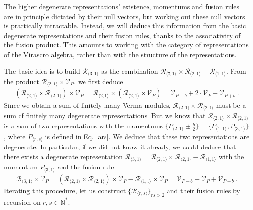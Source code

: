 \documentclass[12pt, a4paper, notitlepage, twoside]{report}
\numberwithin{equation}{section}
\theoremstyle{break}
\begin{document}
The higher degenerate representations' existence, momentums and fusion rules are in principle dictated by their null vectors, but working out these null vectors is practically intractable. 
Instead, we will deduce this information from the basic degenerate representations and their fusion rules, thanks to the associativity of the fusion product. 
This amounts to working with the category of representations of the Virasoro algebra, rather than with the structure of the representations. 

The basic idea is to build $\mathcal{R}_{\langle 3, 1\rangle}$ as the combination $\mathcal{R}_{\langle 2,1 \rangle} \times \mathcal{R}_{\langle 2,1 \rangle} - \mathcal{R}_{\langle 1,1 \rangle}$.
From the product $\mathcal{R}_{\langle 2,1 \rangle}\times \mathcal{V}_P$, we first deduce 
\begin{align}
 \left(\mathcal{R}_{\langle 2,1 \rangle}\times \mathcal{R}_{\langle 2,1 \rangle}\right)\times\mathcal{V}_P = \mathcal{R}_{\langle 2,1 \rangle}\times \left(\mathcal{R}_{\langle 2,1 \rangle}\times\mathcal{V}_P\right) = 
 \mathcal{V}_{P-b} + 2\cdot \mathcal{V}_P + \mathcal{V}_{P+b}\ .
\end{align}
Since we obtain a sum of finitely many Verma modules, $\mathcal{R}_{\langle 2,1 \rangle}\times \mathcal{R}_{\langle 2,1 \rangle}$ must be a sum of finitely many degenerate representations. But we know that $\mathcal{R}_{\langle 2,1 \rangle}\times \mathcal{R}_{\langle 2,1 \rangle}$ is a sum of two representations with the momentums $\{P_{\langle 2,1 \rangle} \pm \frac{b}{2}\} = \{P_{\langle 1,1\rangle}, P_{\langle 3,1\rangle}\}$, where $P_{\langle r,s\rangle}$ is defined in Eq. \eqref{ars}. 
We deduce that these two representations are degenerate. In particular, if we did not know it already, we could deduce that there exists a degenerate representation $\mathcal{R}_{\langle 3, 1\rangle}=\mathcal{R}_{\langle 2,1 \rangle}\times \mathcal{R}_{\langle 2,1 \rangle} -\mathcal{R}_{\langle 1,1\rangle}$ with the momentum $P_{\langle 3,1\rangle}$ and the fusion rule 
\begin{align}
 \mathcal{R}_{\langle 3, 1\rangle}\times \mathcal{V}_P = \left(\mathcal{R}_{\langle 2,1 \rangle}\times \mathcal{R}_{\langle 2,1 \rangle}\right)\times\mathcal{V}_P - \mathcal{R}_{\langle 1,1\rangle}\times \mathcal{V}_P =  \mathcal{V}_{P-b} + \mathcal{V}_P + \mathcal{V}_{P+b}\ .
\end{align}
Iterating this procedure, let us construct $\{\mathcal{R}_{\langle r,s\rangle}\}_{rs>2}$  and their fusion rules by recursion on $r,s\in\mathbb{N}^*$. 
\end{document}
